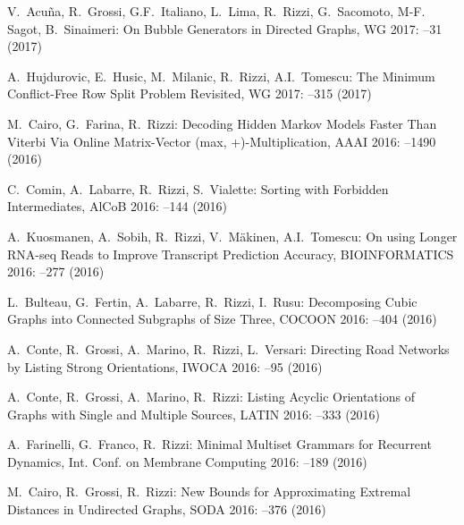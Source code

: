 \begin{etaremune}
  \item {\sc V.~Acu\~na, R.~Grossi, G.F.~Italiano, L.~Lima, R.~Rizzi, G.~Sacomoto, M-F. Sagot, B.~Sinaimeri:}
   \newblock On Bubble Generators in Directed Graphs,
   \newblock  WG 2017:
   --31 (2017)

  \item {\sc A.~Hujdurovic, E.~Husic, M.~Milanic, R.~Rizzi, A.I.~Tomescu:}
   \newblock The Minimum Conflict-Free Row Split Problem Revisited,
   \newblock  WG 2017:
   --315 (2017)

  \item {\sc M.~Cairo, G.~Farina, R.~Rizzi:}
   \newblock Decoding Hidden Markov Models Faster Than Viterbi Via Online Matrix-Vector (max, +)-Multiplication,
   \newblock AAAI 2016:
   --1490 (2016)

  \item {\sc C.~Comin, A.~Labarre, R.~Rizzi, S.~Vialette:}
   \newblock Sorting with Forbidden Intermediates,
   \newblock AlCoB 2016:
   --144 (2016)

  \item {\sc A.~Kuosmanen, A.~Sobih, R.~Rizzi, V.~Mäkinen, A.I.~Tomescu:}
   \newblock On using Longer RNA-seq Reads to Improve Transcript Prediction Accuracy,
   \newblock BIOINFORMATICS 2016:
   --277 (2016)

  \item {\sc L.~Bulteau, G.~Fertin, A.~Labarre, R.~Rizzi, I.~Rusu:}
   \newblock Decomposing Cubic Graphs into Connected Subgraphs of Size Three,
   \newblock COCOON 2016:
   --404 (2016)

  \item {\sc A.~Conte, R.~Grossi, A.~Marino, R.~Rizzi, L.~Versari:}
   \newblock Directing Road Networks by Listing Strong Orientations,
   \newblock IWOCA 2016:
   --95 (2016)

  \item {\sc A.~Conte, R.~Grossi, A.~Marino, R.~Rizzi:}
   \newblock Listing Acyclic Orientations of Graphs with Single and Multiple Sources,
   \newblock LATIN 2016:
   --333 (2016)

  \item {\sc A.~Farinelli, G.~Franco, R.~Rizzi:}
   \newblock Minimal Multiset Grammars for Recurrent Dynamics,
   \newblock Int. Conf. on Membrane Computing 2016:
   --189 (2016)

  \item {\sc M.~Cairo, R.~Grossi, R.~Rizzi:}
   \newblock New Bounds for Approximating Extremal Distances in Undirected Graphs,
   \newblock SODA 2016:
   --376 (2016)


\end{etaremune}
